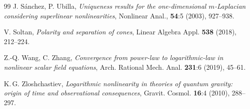 \documentclass[12pt]{amsart}
\numberwithin{equation}{section}
\theoremstyle{plain}
\theoremstyle{plain}
\theoremstyle{plain}
\theoremstyle{definition}
\begin{document}
\begin{thebibliography}{99}
J. S\'anchez, P. Ubilla,
\emph{Uniqueness results for the one-dimensional $m$-Laplacian considering superlinear nonlinearities}, 
Nonlinear Anal., \textbf{54}:5 (2003), 927--938.



V. Soltan,
\emph{Polarity and separation of cones},
Linear Algebra Appl. \textbf{538} (2018), 212--224.





Z.-Q. Wang, C. Zhang,
\emph{Convergence from power-law to logarithmic-law in nonlinear scalar field equations},
Arch. Rational Mech. Anal. \textbf{231}:6 (2019), 45--61.



K.$\,$G. Zloshchastiev,
\emph{Logarithmic nonlinearity in theories of quantum gravity: origin of time and observational consequences},
Gravit. Cosmol. \textbf{16}:4 (2010), 288--297.

\end{thebibliography}
\end{document}
